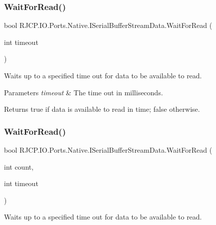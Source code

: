 \subsubsection{\texorpdfstring{WaitForRead()}{WaitForRead()}\hspace{0.1cm}{\footnotesize\ttfamily [1/2]}}
{\footnotesize\ttfamily bool R\+J\+C\+P.\+I\+O.\+Ports.\+Native.\+I\+Serial\+Buffer\+Stream\+Data.\+Wait\+For\+Read (\begin{DoxyParamCaption}\item[{int}]{timeout }\end{DoxyParamCaption})}



Waits up to a specified time out for data to be available to read. 


\begin{DoxyParams}{Parameters}
{\em timeout} & The time out in milliseconds.\\
\hline
\end{DoxyParams}
\begin{DoxyReturn}{Returns}
{\ttfamily true} if data is available to read in time; {\ttfamily false} otherwise.
\end{DoxyReturn}
\mbox{\label{interface_r_j_c_p_1_1_i_o_1_1_ports_1_1_native_1_1_i_serial_buffer_stream_data_aaec861ebbf441eaf738fec441d449ccf}} 
\subsubsection{\texorpdfstring{WaitForRead()}{WaitForRead()}\hspace{0.1cm}{\footnotesize\ttfamily [2/2]}}
{\footnotesize\ttfamily bool R\+J\+C\+P.\+I\+O.\+Ports.\+Native.\+I\+Serial\+Buffer\+Stream\+Data.\+Wait\+For\+Read (\begin{DoxyParamCaption}\item[{int}]{count,  }\item[{int}]{timeout }\end{DoxyParamCaption})}



Waits up to a specified time out for data to be available to read. 


